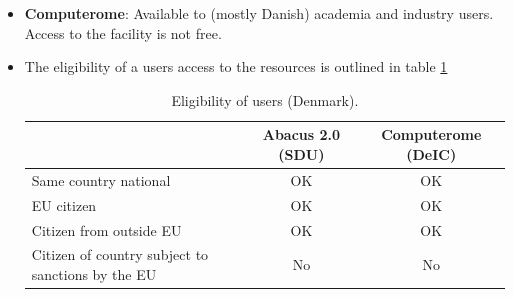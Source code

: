 \documentclass{article}
\begin{document}
\begin{itemize}
\begin{itemize}
        \item[]\textbf{Computerome}: Available to (mostly Danish) academia and industry users.
        Access to the facility is not free.
        \item[]The eligibility of a users access to the resources is outlined in table \ref{tab:DK_user_elegibility}
        \begin{table}[!h]
       \centering
        \begin{tabular}{|l|c|c|}
            \hline
        & Abacus 2.0 (SDU) & Computerome (DeIC) \\
        \hline
      Same country national  &   OK  &  OK \\
        \hline
        EU citizen      &   OK  &  OK  \\
            \hline
            Citizen from outside EU	        &   OK  &  OK  \\
            \hline
            Citizen of country subject to sanctions by the EU & No & No \\
            \hline
            \end{tabular}
        \caption{Eligibility of users (Denmark).}
        \label{tab:DK_user_elegibility}
    \end{table}


\end{itemize}
\end{itemize}
\end{document}
